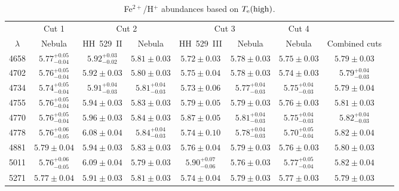 \documentclass[fleqn,usenatbib]{mnras}
\begin{document}
\begin{table*}
\centering
\caption{Fe$^{2+}$/H$^{+}$ abundances based on $T_{\rm e} (\text{high})$.}
\label{tab:Fe3_abundances_high}
\begin{tabular}{ccccccccc}
\hline
 & \multicolumn{1}{c}{Cut 1} & \multicolumn{2}{c}{Cut 2} & \multicolumn{2}{c}{Cut 3} & \multicolumn{1}{c}{Cut 4} \\
$\lambda$ &  Nebula & HH~529~II &  Nebula & HH~529~III &  Nebula &  Nebula & Combined cuts\\
\hline

4658  & $5.77^{+0.05} _{-0.04}$ & $5.92^{+0.03} _{-0.02}$ & $5.81 \pm 0.03$ & $5.72 \pm 0.03$  & $5.78 \pm 0.03$ & $5.75 \pm 0.03$ & $5.79 \pm 0.03$   \\

4702 & $5.76^{+0.05} _{-0.04}$ & $5.92 \pm 0.03$  & $5.80 \pm 0.03$ & $5.75 \pm 0.04$ & $5.78 \pm 0.03$ & $5.74 \pm 0.03$ &  $5.79^{+0.04} _{-0.03}$ \\

4734 & $5.74^{+0.05} _{-0.04}$ & $5.91^{+0.04} _{-0.03}$ & $5.81^{+0.04} _{-0.03}$ &  $5.73 \pm 0.06$ & $5.77^{+0.04} _{-0.03}$ & $5.75^{+0.04} _{-0.03}$ &  $5.79 \pm 0.04$ \\

4755 & $5.76^{+0.05} _{-0.04}$ & $5.94 \pm 0.03$ & $5.83 \pm 0.03$&  $5.79 \pm 0.05$  & $5.79 \pm 0.03$ & $5.76 \pm 0.03$ &$5.81 \pm 0.03$  \\

4770 & $5.76^{+0.05} _{-0.04}$ & $5.96 \pm 0.03$ & $5.84 \pm 0.03$ & $5.87 \pm 0.05$ & $5.81^{+0.04} _{-0.03}$ & $5.75^{+0.04} _{-0.03}$ & $5.82^{+0.04} _{-0.03}$ \\

4778 & $5.76^{+0.06} _{-0.05}$ &  $6.08 \pm 0.04$ & $5.84^{+0.04} _{-0.03}$ &  $5.74 \pm 0.10$ & $5.78^{+0.04} _{-0.03}$ & $5.70^{+0.05} _{-0.04}$ & $5.82 \pm 0.04$  \\

4881 & $5.79 \pm 0.04$ & $5.94 \pm 0.03$  & $5.83 \pm 0.03$ &  $5.76 \pm 0.04$ & $5.79 \pm 0.03$ & $5.76 \pm 0.03$ & $5.80 \pm 0.03$ \\

5011 & $5.76^{+0.06} _{-0.05}$ & $6.09 \pm 0.04$ & $5.79 \pm 0.03$ &   $5.90^{+0.07} _{-0.06}$ & $5.76 \pm 0.03$ & $5.77^{+0.05} _{-0.04}$ & $5.82 \pm 0.04$ \\

5271 & $5.77 \pm 0.04$ & $5.91 \pm 0.03$  & $5.81 \pm 0.03$ &  $5.74 \pm 0.04$ & $5.79 \pm 0.03$ & $5.77 \pm 0.03$ & $5.79 \pm 0.03$ \\


\end{tabular}
\end{table*}
\end{document}
